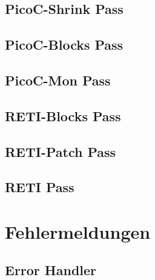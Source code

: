 \subsection{PicoC-Shrink Pass}
\subsection{PicoC-Blocks Pass}
\subsection{PicoC-Mon Pass}
\subsection{RETI-Blocks Pass}
\subsection{RETI-Patch Pass}
\subsection{RETI Pass}
\section{Fehlermeldungen}
\subsection{Error Handler}
